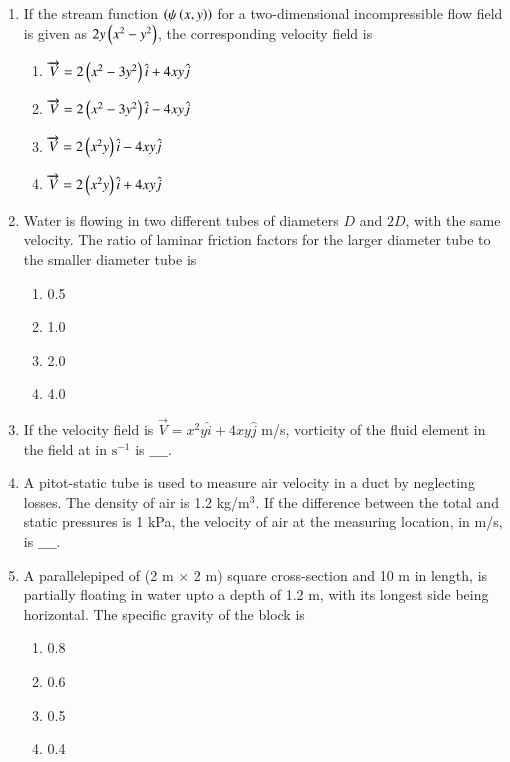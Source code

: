 \documentclass[journal]{IEEEtran}
\begin{document}
\begin{enumerate}
\item If the stream function $\left(\psi\left(x,y\right)\right)$ for a two-dimensional incompressible flow field is given as $2y\left(x^2 - y^2\right)$, the corresponding velocity field is 
\begin{enumerate}
    \item $\overrightarrow{V} = 2\left(x^2 - 3y^2\right)\hat{i} + 4xy\hat{j}$
    \item $\overrightarrow{V} = 2\left(x^2 - 3y^2\right)\hat{i} - 4xy\hat{j}$
    \item $\overrightarrow{V} = 2\left(x^2y\right)\hat{i} - 4xy\hat{j}$
    \item $\overrightarrow{V} = 2\left(x^2y\right)\hat{i} + 4xy\hat{j}$ \\
\end{enumerate}
\item Water is flowing in two different tubes of diameters $D$ and $2D$, with the same velocity. The ratio of laminar friction factors for the larger diameter tube to the smaller diameter tube is 
\begin{enumerate}
    \item 0.5
    \item 1.0
    \item 2.0
    \item 4.0 \\
\end{enumerate}
\item If the velocity field is $\overrightarrow{V} = x^2y\hat{i} + 4xy\hat{j}$ m/s, vorticity of the fluid element in the field at  in $\text{s}^{-1}$ is $\_\_\_\_$. \\
\item A pitot-static tube is used to measure air velocity in a duct by neglecting losses. The density of air is 1.2 kg/$\text{m}^3$. If the difference between the total and static pressures is 1 kPa, the velocity of air at the measuring location, in m/s, is $\_\_\_\_$. \\
\item A parallelepiped of (2 m $\times$ 2 m) square cross-section and 10 m in length, is partially floating in water upto a depth of 1.2 m, with its longest side being horizontal. The specific gravity of the block is
 \begin{enumerate}
    \item 0.8
    \item 0.6
    \item 0.5
    \item 0.4 \\

\end{enumerate}
\end{enumerate}
\end{document}
